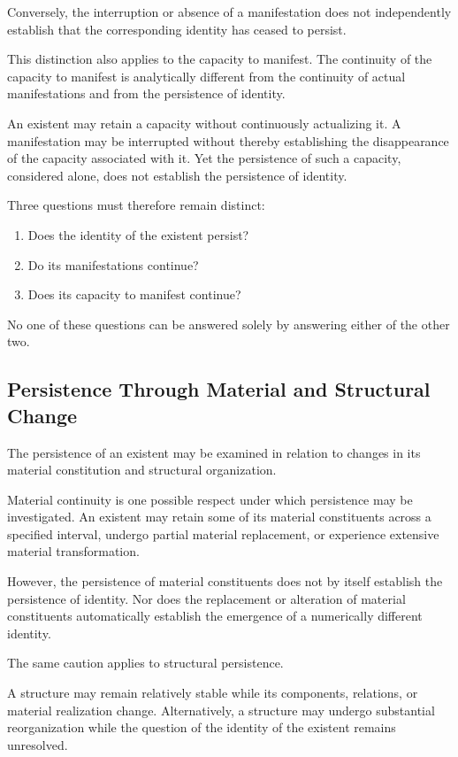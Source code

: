 Conversely, the interruption or absence of a manifestation
does not independently establish that the corresponding
identity has ceased to persist.

This distinction also applies to the capacity to manifest.
The continuity of the capacity to manifest is analytically
different from the continuity of actual manifestations
and from the persistence of identity.

An existent may retain a capacity without continuously
actualizing it. A manifestation may be interrupted
without thereby establishing the disappearance of
the capacity associated with it. Yet the persistence
of such a capacity, considered alone, does not establish
the persistence of identity.

Three questions must therefore remain distinct:

\begin{enumerate}
    \item Does the identity of the existent persist?
    \item Do its manifestations continue?
    \item Does its capacity to manifest continue?
\end{enumerate}

No one of these questions can be answered solely by
answering either of the other two.

\subsection{Persistence Through Material and Structural Change}

The persistence of an existent may be examined in relation
to changes in its material constitution and structural
organization.

Material continuity is one possible respect under which
persistence may be investigated. An existent may retain
some of its material constituents across a specified
interval, undergo partial material replacement, or
experience extensive material transformation.

However, the persistence of material constituents does
not by itself establish the persistence of identity.
Nor does the replacement or alteration of material
constituents automatically establish the emergence
of a numerically different identity.

The same caution applies to structural persistence.

A structure may remain relatively stable while its
components, relations, or material realization change.
Alternatively, a structure may undergo substantial
reorganization while the question of the identity of
the existent remains unresolved.

